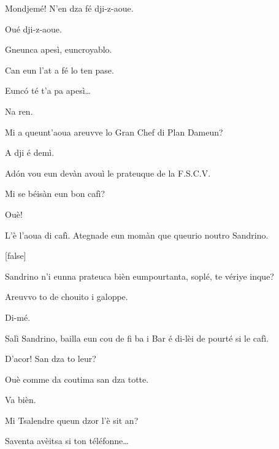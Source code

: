 \begin{drama}


\Richardspeaks Mondjemé! N'en dza fé dji-z-aoue.

\Gerominespeaks Oué dji-z-aoue.

\Richardspeaks Gneunca apesì, euncroyablo.

\Gerominespeaks Can eun l'at a fé lo ten pase.

\Richardspeaks{} Eunc\'o té t'a pa apesì\ldots

\Spritzspeaks Na ren.

\Richardspeaks Mi a queunt’aoua areuvve lo Gran Chef di Plan Dameun?

\Saventaspeaks A dji é demì.

\Richardspeaks Ad\'on vou eun devàn avouì le prateuque de la F.S.C.V.



\Tuenospeaks Mi se béisàn eun bon cafì?

\Tcheuttespeaks Ouè!

\Tuenospeaks L'è l'aoua di cafì. Ategnade eun momàn que queurio noutro Sandrino.


[false]


\Tuenospeaks Sandrino n'i eunna prateuca bièn eumpourtanta, soplé, te vériye inque?

\Sandrinospeaks Areuvvo to de chouito i galoppe.


\Sandrinospeaks{} Di-mé.

\Tuenospeaks Salì Sandrino, bailla eun cou de fi ba i Bar é di-lèi de pourté si le cafì.

\Sandrinospeaks D'acor! San dza to leur?

\Tuenospeaks Ouè comme da coutima san dza totte.

\Sandrinospeaks Va bièn. 


\Gerominespeaks Mi Tsalendre queun dzor l'è sit an?

\Tuenospeaks Saventa avèitsa si ton téléfonne\ldots


\end{drama}
